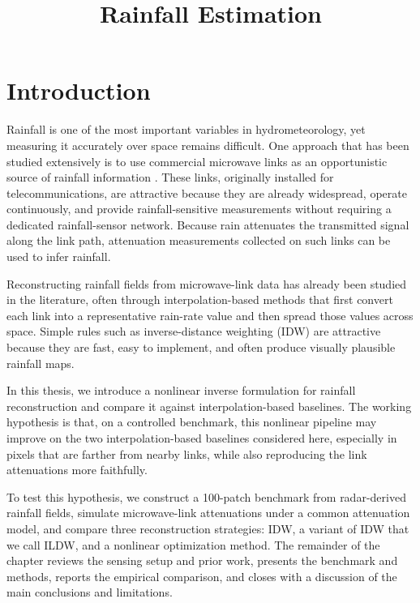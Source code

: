 \documentclass[11pt]{article}
\title{Rainfall Estimation}
\author{}
\date{}
\begin{document}
\maketitle
\tableofcontents
\clearpage

\section{Introduction}
Rainfall is one of the most important variables in hydrometeorology, yet measuring it accurately over space remains difficult. One approach that has been studied extensively is to use commercial microwave links as an opportunistic source of rainfall information \citep{messer2006environmental,goldshtein2009rain,chwala2019cml,lian2022cmlreview}. These links, originally installed for telecommunications, are attractive because they are already widespread, operate continuously, and provide rainfall-sensitive measurements without requiring a dedicated rainfall-sensor network. Because rain attenuates the transmitted signal along the link path, attenuation measurements collected on such links can be used to infer rainfall.

Reconstructing rainfall fields from microwave-link data has already been studied in the literature, often through interpolation-based methods that first convert each link into a representative rain-rate value and then spread those values across space. Simple rules such as inverse-distance weighting (IDW) are attractive because they are fast, easy to implement, and often produce visually plausible rainfall maps.

In this thesis, we introduce a nonlinear inverse formulation for rainfall reconstruction and compare it against interpolation-based baselines. The working hypothesis is that, on a controlled benchmark, this nonlinear pipeline may improve on the two interpolation-based baselines considered here, especially in pixels that are farther from nearby links, while also reproducing the link attenuations more faithfully.

To test this hypothesis, we construct a 100-patch benchmark from radar-derived rainfall fields, simulate microwave-link attenuations under a common attenuation model, and compare three reconstruction strategies: IDW, a variant of IDW that we call ILDW, and a nonlinear optimization method. The remainder of the chapter reviews the sensing setup and prior work, presents the benchmark and methods, reports the empirical comparison, and closes with a discussion of the main conclusions and limitations.
\end{document}
